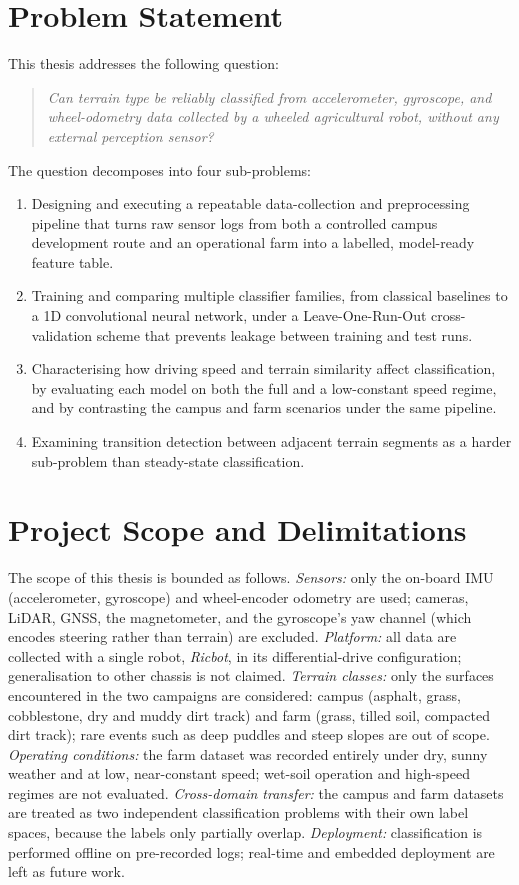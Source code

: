 \section{Problem Statement}
This thesis addresses the following question:
\begin{quote}
\emph{Can terrain type be reliably classified from accelerometer, gyroscope, and wheel-odometry data collected by a wheeled agricultural robot, without any external perception sensor?}
\end{quote}
The question decomposes into four sub-problems:
\begin{enumerate}
    \item Designing and executing a repeatable data-collection and preprocessing pipeline that turns raw sensor logs from both a controlled campus development route and an operational farm into a labelled, model-ready feature table.
    \item Training and comparing multiple classifier families, from classical baselines to a 1D convolutional neural network, under a Leave-One-Run-Out cross-validation scheme that prevents leakage between training and test runs.
    \item Characterising how driving speed and terrain similarity affect classification, by evaluating each model on both the full and a low-constant speed regime, and by contrasting the campus and farm scenarios under the same pipeline.
    \item Examining transition detection between adjacent terrain segments as a harder sub-problem than steady-state classification.
\end{enumerate}


\section{Project Scope and Delimitations}

The scope of this thesis is bounded as follows. \emph{Sensors:} only the on-board IMU (accelerometer, gyroscope) and wheel-encoder odometry are used; cameras, LiDAR, GNSS, the magnetometer, and the gyroscope's yaw channel (which encodes steering rather than terrain) are excluded. \emph{Platform:} all data are collected with a single robot, \emph{Ricbot}, in its differential-drive configuration; generalisation to other chassis is not claimed. \emph{Terrain classes:} only the surfaces encountered in the two campaigns are considered: campus (asphalt, grass, cobblestone, dry and muddy dirt track) and farm (grass, tilled soil, compacted dirt track); rare events such as deep puddles and steep slopes are out of scope. \emph{Operating conditions:} the farm dataset was recorded entirely under dry, sunny weather and at low, near-constant speed; wet-soil operation and high-speed regimes are not evaluated. \emph{Cross-domain transfer:} the campus and farm datasets are treated as two independent classification problems with their own label spaces, because the labels only partially overlap. \emph{Deployment:} classification is performed offline on pre-recorded logs; real-time and embedded deployment are left as future work.


